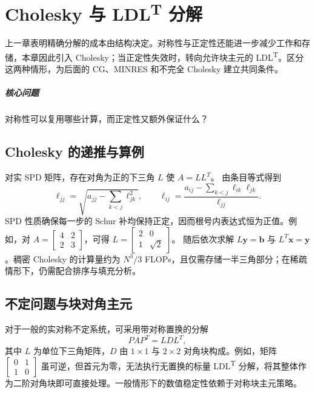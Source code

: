 \chapter{Cholesky 与 LDL\textsuperscript{T} 分解}\label{v0ch:6}
\begin{chaptersummary}
上一章表明精确分解的成本由结构决定。对称性与正定性还能进一步减少工作和存储，本章因此引入 Cholesky；当正定性失效时，转向允许块主元的 LDL\textsuperscript{T}。区分这两种情形，为后面的 CG、MINRES 和不完全 Cholesky 建立共同条件。
\end{chaptersummary}
\paragraph{核心问题}对称性可以复用哪些计算，而正定性又额外保证什么？

\section{Cholesky 的递推与算例}
对实 SPD 矩阵，存在对角为正的下三角 $L$ 使 $A=LL^T$。
由条目等式得到
\[
 \ell_{jj}=\sqrt{a_{jj}-\sum_{k<j}\ell_{jk}^2},\qquad
 \ell_{ij}=\frac{a_{ij}-\sum_{k<j}\ell_{ik}\ell_{jk}}{\ell_{jj}}.
\]
SPD 性质确保每一步的 Schur 补均保持正定，因而根号内表达式恒为正值。例如，对
$A=\left[\begin{smallmatrix}4&2\\2&3\end{smallmatrix}\right]$，可得
$L=\left[\begin{smallmatrix}2&0\\1&\sqrt2\end{smallmatrix}\right]$。
随后依次求解 $L\bm y=\bm b$ 与 $L^T\bm x=\bm y$。稠密 Cholesky 的计算量约为 $N^3/3$ FLOPs，且仅需存储一半三角部分；在稀疏情形下，仍需配合排序与填充分析。
\section{不定问题与块对角主元}
对于一般的实对称不定系统，可采用带对称置换的分解
\[
 PAP^T=LDL^T,
\]
其中 $L$ 为单位下三角矩阵，$D$ 由 $1\times1$ 与 $2\times2$ 对角块构成。例如，矩阵
$\left[\begin{smallmatrix}0&1\\1&0\end{smallmatrix}\right]$ 虽可逆，但首元为零，无法执行无置换的标量 LDL\textsuperscript{T} 分解，将其整体作为二阶对角块即可直接处理。一般情形下的数值稳定性依赖于对称块主元策略。
